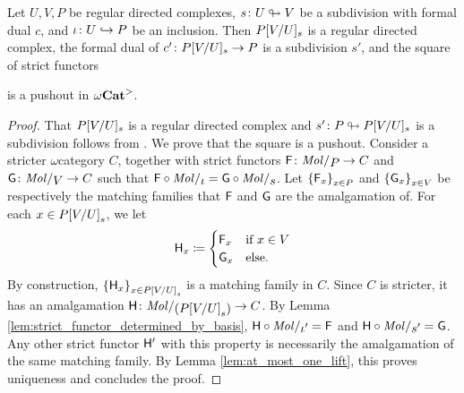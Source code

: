 \begin{lem} \label{lem:generalised_substitution}
    Let \( U, V, P \) be regular directed complexes, \( s \colon U \looparrowright V \) be a subdivision with formal dual \( c \), and \( \iota \colon U \hookrightarrow P \) be an inclusion.
    Then \( P[V/U]_s \) is a regular directed complex, the formal dual of \( c' \colon P[V/U]_s \to P \) is a subdivision \( s' \), and the square of strict functors
    \begin{center}
    \end{center}
    is a pushout in \( {\omega\mathbf{Cat}}^> \).
\end{lem}
\begin{proof}
    That \( P[V/U]_s \) is a regular directed complex and \( s' \colon P \looparrowright P[V/U]_s \) is a subdivision follows from \cite[Proposition 1.46, Comment 1.48]{chanavat2025semistrict}.
    We prove that the square is a pushout.
    Consider a stricter \( \omega \)\nbd category \( C \), together with strict functors \( \F \colon \molecin{P} \to C \) and \( \G \colon \molecin{V} \to C \) such that \( \F \after \molecin{\iota} = \G \after \molecin{s} \).
    Let \( \left\{ {\mathsf{F}_x} \right\}_{x \in P} \) and \( \left\{ {\mathsf{G}_x} \right\}_{x \in V} \) be respectively the matching families that \( \mathsf{F} \) and \( \mathsf{G} \) are the amalgamation of.
    For each \( x \in {P[V/U]}_s \), we let 
    \begin{equation} \label{eq:H_matching_of}
        \mathsf{H}_x \coloneqq 
        \begin{cases}
            \mathsf{F}_x & \text{if } x \in V \\
            \mathsf{G}_x & \text{else}.
        \end{cases}
    \end{equation}
    By construction, \( \left\{ {\mathsf{H}_x} \right\}_{x \in {P[V/U]}_s} \) is a matching family in \( C \).
    Since \( C \) is stricter, it has an amalgamation \( \fun{H} \colon \molecin{({\subs P V U}_s)} \to C \).
    By Lemma \ref{lem:strict_functor_determined_by_basis}, \( \fun{H} \after \molecin{\iota'} = \F \) and \( \fun{H} \after \molecin{s'} = \G \).
    Any other strict functor \( \mathsf{H}' \) with this property is necessarily the amalgamation of the same matching family.
    By Lemma \ref{lem:at_most_one_lift}, this proves uniqueness and concludes the proof. 
\end{proof}

